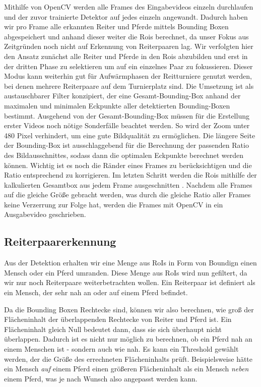 Mithilfe von OpenCV werden alle Frames des Eingabevideos einzeln durchlaufen und der zuvor trainierte Detektor auf jedes einzeln angewandt. Dadurch haben wir pro Frame alle erkannten Reiter und Pferde mittels Bounding Boxen abgespeichert und anhand dieser weiter die Rois berechnet, da unser Fokus aus Zeitgründen noch nicht auf Erkennung von Reiterpaaren lag. Wir verfolgten hier den Ansatz zunächst alle Reiter und Pferde in den Rois abzubilden und erst in der dritten Phase zu selektieren um auf ein einzelnes Paar zu fokussieren. Dieser Modus kann weiterhin gut für Aufwärmphasen der Reitturniere genutzt werden, bei denen mehrere Reiterpaare auf dem Turnierplatz sind. Die Umsetzung ist als austauschbarer Filter konzipiert, der eine Gesamt-Bounding-Box anhand der maximalen und minimalen Eckpunkte aller detektierten Bounding-Boxen bestimmt.
Ausgehend von der Gesamt-Bounding-Box müssen für die Erstellung erster Videos noch nötige Sonderfälle beachtet werden. So wird der Zoom unter 480 Pixel verhindert, um eine gute Bildqualität zu ermöglichen. Die längere Seite der Bounding-Box ist ausschlaggebend für die Berechnung der passenden Ratio des Bildausschnittes, sodass dann die optimalen  Eckpunkte berechnet werden können. Wichtig ist es noch die Ränder eines Frames zu berücksichtigen und die Ratio entsprechend zu korrigieren.
Im letzten Schritt werden die Rois mithilfe der kalkulierten Gesamtbox aus jedem Frame ausgeschnitten  . Nachdem alle Frames auf die gleiche Größe gebracht werden, was durch die gleiche Ratio aller Frames keine Verzerrung zur Folge hat, werden die Frames mit OpenCV in ein Ausgabevideo geschrieben.


\subsection*{Reiterpaarerkennung}
Aus der Detektion erhalten wir eine Menge aus RoIs in Form von Boundign einen Mensch oder ein Pferd umranden. Diese Menge aus RoIs wird nun  gefiltert, da wir nur noch Reiterpaare weiterbetrachten wollen. Ein Reiterpaar ist definiert als ein Mensch, der sehr nah an oder auf einem Pferd befindet.

Da die Bounding Boxen Rechtecke sind, können wir also berechnen, wie groß der Flächeninhalt der überlappenden Rechtecke von Reiter und Pferd ist. Ein Flächeninhalt gleich Null bedeutet dann, dass sie sich überhaupt nicht überlappen.
Dadurch ist es nicht nur möglich zu berechnen, ob ein Pferd nah an einem Menschen ist - sondern auch wie nah. Es kann ein Threshold gewählt werden, der die Größe des errechneten Flächeninhalts prüft. Beispielsweise hätte ein Mensch \emph{auf} einem Pferd einen größeren Flächeninhalt als ein Mensch \emph{neben} einem Pferd, was je nach Wunsch also angepasst werden kann.

